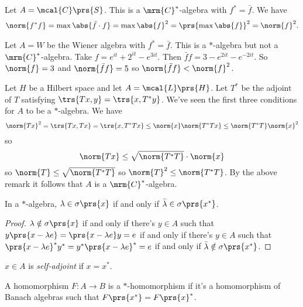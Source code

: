 \documentclass[10pt, twoside]{book}
\begin{document}
\begin{example}
Let $A = \mcal{C}\prs{S}$. This is a $\mrm{C}^*$-algebra with $f^* = \bar{f}$. We have
\begin{align*}
\norm{f^* f} = \max \abs{\bar{f} \cdot f} = \max \abs{f}^2 = \prs{\max \abs{f}}^2 = \norm{f}^2 \text{.}
\end{align*}
\end{example}

\begin{example}
Let $A = W$ be the Wiener algebra with $f^* = \bar{f}$. This is a $*$-algebra but not a $\mrm{C}^*$-algebra. Take $f = e^{it} + 2^{it} - e^{3 it}$. Then $\bar{f} f = 3 - e^{2 it} - e^{-2 it}$. So $\norm{f} = 3$ and $\norm{\bar{f} f} = 5$ so $\norm{\bar{f} f} < \norm{f}^2$.
\end{example}

\begin{example}
Let $H$ be a Hilbert space and let $A =\mcal{L}\prs{H}$. Let $T^*$ be the adjoint of $T$ satisfying $\trs{Tx, y} = \trs{x, T^* y}$. We've seen the first three conditions for $A$ to be a $*$-algebra. We have
\[\norm{Tx}^2 = \trs{Tx, Tx} = \trs{x, T^* T x} \leq \norm{x} \norm{T^* T x} \leq \norm{T^* T} \norm{x}^2\]
so
\[\norm{T x} \leq \sqrt{\norm{T^* T}} \cdot \norm{x}\]
so $\norm{T} \leq \sqrt{\norm{T^* T}}$
so
$\norm{T}^2 \leq \norm{T^* T}$.
By the above remark it follows that $A$ is a $\mrm{C}^*$-algebra.
\end{example}

\begin{proposition}
In a $*$-algebra, $\lambda \in \sigma\prs{x}$ if and only if $\bar{\lambda} \in \sigma\prs{x^*}$.
\end{proposition}

\begin{proof}
$\lambda \notin \sigma\prs{x}$ if and only if there's $y \in A$ such that $y\prs{x-\lambda e} = \prs{x-\lambda e} y = e$ if and only if there's $y \in A$ such that $\prs{x-\lambda e}^* y^*  = y^* \prs{x-\lambda e}^* = e$ if and only if $\bar{\lambda} \notin \sigma\prs{x^*}$.
\end{proof}

\begin{definition}
$x \in A$ is \emph{self-adjoint} if $x = x^*$.
\end{definition}

\begin{definition}[$*$-Homomorphism]
A homomorphism $F \colon A \to B$ is a $*$-homomorphism if it's a homomorphism of Banach algebras such that $F\prs{x^*} = F\prs{x}^*$.
\end{definition}
\end{document}
